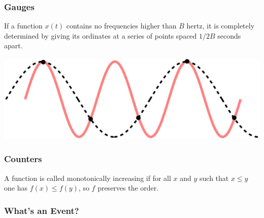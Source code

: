 \begin{frame}
    \frametitle{Gauges}

    \begin{theorem}
        If a function $x(t)$ contains no frequencies higher than $B$ hertz, it
        is completely determined by giving its ordinates at a series of points
        spaced $1 / 2B$ seconds apart.
    \end{theorem}

    \begin{center}
        \includegraphics[width=0.8\linewidth]{CPT-sound-nyquist-thereom-1.5percycle.png}
    \end{center}
\end{frame}

\begin{frame}
    \frametitle{Counters}

    \begin{definition}
        A function is called monotonically increasing if for all $x$ and
        $y$ such that $x \leq y$ one has
        $f(x) \leq f(y)$, so $f$
        preserves the order.
    \end{definition}

    \begin{center}
    \end{center}
\end{frame}

\begin{frame}
    \frametitle{What's an Event?}

\end{frame}

